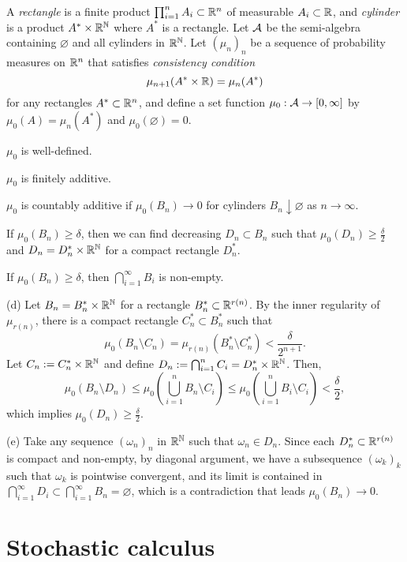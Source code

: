 \documentclass{../../large}
\begin{document}
\begin{prb}
A \emph{rectangle} is a finite product $\prod_{i=1}^nA_i\subset\mathbb{R}^n$ of measurable $A_i\subset\mathbb{R}$, and \emph{cylinder} is a product $A^*\times\mathbb{R}^{\mathbb{N}}$ where $A^*$ is a rectangle.
Let $\mathcal{A}$ be the semi-algebra containing $\varnothing$ and all cylinders in $\mathbb{R}^{\mathbb{N}}$.
Let $(\mu_n)_n$ be a sequence of probability measures on $\mathbb{R}^n$ that satisfies \emph{consistency condition}
\[\mu_{n+1}(A^*\times\mathbb{R})=\mu_n(A^*)\]
for any rectangles $A^*\subset\mathbb{R}^n$, and define a set function $\mu_0:\mathcal{A}\to[0,\infty]$ by $\mu_0(A)=\mu_n(A^*)$ and $\mu_0(\varnothing)=0$.
\begin{parts}
\item $\mu_0$ is well-defined.
\item $\mu_0$ is finitely additive.
\item $\mu_0$ is countably additive if $\mu_0(B_n)\to0$ for cylinders $B_n\downarrow\varnothing$ as $n\to\infty$.
\item If $\mu_0(B_n)\ge\delta$, then we can find decreasing $D_n\subset B_n$ such that $\mu_0(D_n)\ge\frac\delta2$ and $D_n=D_n^*\times\mathbb{R}^{\mathbb{N}}$ for a compact rectangle $D_n^*$.
\item If $\mu_0(B_n)\ge\delta$, then $\bigcap_{i=1}^\infty B_i$ is non-empty.
\end{parts}
\end{prb}
\begin{pf}
(d)
Let $B_n=B_n^*\times\mathbb{R}^{\mathbb{N}}$ for a rectangle $B_n^*\subset\mathbb{R}^{r(n)}$.
By the inner regularity of $\mu_{r(n)}$, there is a compact rectangle $C_n^*\subset B_n^*$ such that
\[\mu_0(B_n\setminus C_n)=\mu_{r(n)}(B_n^*\setminus C_n^*)<\frac\delta{2^{n+1}}.\]
Let $C_n:=C_n^*\times\mathbb{R}^{\mathbb{N}}$ and define $D_n:=\bigcap_{i=1}^nC_i=D_n^*\times\mathbb{R}^{\mathbb{N}}$.
Then,
\[\mu_0(B_n\setminus D_n)\le\mu_0(\bigcup_{i=1}^nB_n\setminus C_i)\le\mu_0(\bigcup_{i=1}^nB_i\setminus C_i)<\frac\delta2,\]
which implies $\mu_0(D_n)\ge\frac\delta2$.

(e)
Take any sequence $(\omega_n)_n$ in $\mathbb{R}^{\mathbb{N}}$ such that $\omega_n\in D_n$.
Since each $D_n^*\subset\mathbb{R}^{r(n)}$ is compact and non-empty, by diagonal argument, we have a subsequence $(\omega_k)_k$ such that $\omega_k$ is pointwise convergent, and its limit is contained in $\bigcap_{i=1}^\infty D_i\subset\bigcap_{i=1}^\infty B_n=\varnothing$, which is a contradiction that leads $\mu_0(B_n)\to0$.
\end{pf}




\part{Stochastic calculus}
\end{document}
